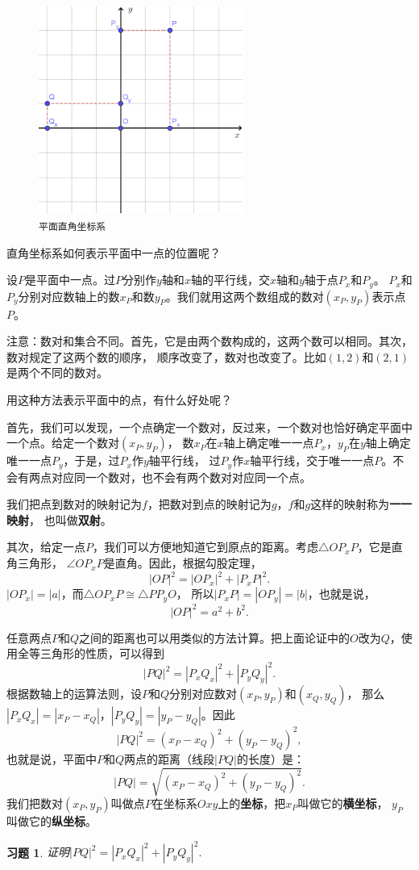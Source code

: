 \documentclass[12pt,UTF8]{ctexbook}
\newtheorem{xt}{习题}[section]
\begin{document}
\begin{figure} %
    \vspace{-30pt}
    \centering
    \includegraphics[width=0.6\textwidth]{坐标系2.png}
    \caption*{\texttt{平面直角坐标系}}
\end{figure}

直角坐标系如何表示平面中一点的位置呢？

设$P$是平面中一点。过$P$分别作$y$轴和$x$轴的平行线，交$x$轴和$y$轴于点$P_x$和$P_y$。
$P_x$和$P_y$分别对应数轴上的数$x_P$和数$y_P$。我们就用这两个数组成的数对$(x_P, y_P)$表示点$P$。

注意：数对和集合不同。首先，它是由两个数构成的，这两个数可以相同。其次，数对规定了这两个数的顺序，
顺序改变了，数对也改变了。比如$(1,2)$和$(2,1)$是两个不同的数对。

用这种方法表示平面中的点，有什么好处呢？

首先，我们可以发现，一个点确定一个数对，反过来，一个数对也恰好确定平面中一个点。给定一个数对$(x_P, y_P)$，
数$x_P$在$x$轴上确定唯一一点$P_x$，$y_P$在$y$轴上确定唯一一点$P_y$，于是，过$P_x$作$y$轴平行线，
过$P_y$作$x$轴平行线，交于唯一一点$P$。不会有两点对应同一个数对，也不会有两个数对对应同一个点。

我们把点到数对的映射记为$f$，把数对到点的映射记为$g$，$f$和$g$这样的映射称为\textbf{一一映射}，
也叫做\textbf{双射}。

其次，给定一点$P$，我们可以方便地知道它到原点的距离。考虑$\triangle OP_xP$，它是直角三角形，
$\angle OP_xP$是直角。因此，根据勾股定理，
$$|OP|^2 = |OP_x|^2 + |P_xP|^2.$$
$|OP_x| = |a|$，而$\triangle OP_xP\cong \triangle PP_yO$，
所以$|P_xP| = |OP_y| = |b|$，也就是说，
$$ |OP|^2 = a^2 + b^2.$$

任意两点$P$和$Q$之间的距离也可以用类似的方法计算。把上面论证中的$O$改为$Q$，使用全等三角形的性质，可以得到
$$|PQ|^2 = |P_xQ_x|^2 + |P_yQ_y|^2.$$
根据数轴上的运算法则，设$P$和$Q$分别对应数对$(x_P, y_P)$和$(x_Q, y_Q)$，
那么$|P_xQ_x| = |x_P- x_Q|$，$|P_yQ_y| = |y_P- y_Q|$。因此
$$ |PQ|^2 = (x_P- x_Q)^2 + (y_P - y_Q)^2,$$
也就是说，平面中$P$和$Q$两点的距离（线段$|PQ|$的长度）是：
$$ |PQ| = \sqrt{(x_P- x_Q)^2 + (y_P - y_Q)^2}.$$
我们把数对$(x_P, y_P)$叫做点$P$在坐标系$Oxy$上的\textbf{坐标}，把$x_P$叫做它的\textbf{横坐标}，
$y_P$叫做它的\textbf{纵坐标}。
\begin{xt}\label{ex:4-0-0}
    证明$|PQ|^2 = |P_xQ_x|^2 + |P_yQ_y|^2.$
\end{xt}
\end{document}
